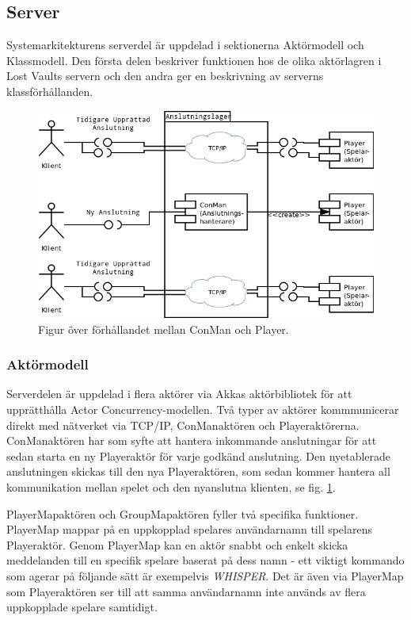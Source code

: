 \documentclass[a4paper]{article}
\begin{document}
\subsection{Server}
Systemarkitekturens serverdel är uppdelad i sektionerna Aktörmodell och Klassmodell. Den första delen beskriver funktionen hos de olika aktörlagren i Lost Vaults servern och den andra ger en  beskrivning av serverns klassförhållanden.

\begin{figure}[hbt]
\centering
\includegraphics[width=1.0\textwidth]{serverActorModel2-1}
\caption{\label{fig:ConManPlayer}Figur över förhållandet mellan ConMan och Player.}
\end{figure}

\subsubsection{Aktörmodell}
Serverdelen är uppdelad i flera aktörer via Akkas aktörbibliotek för att upprätthålla Actor Concurrency-modellen. 
Två typer av aktörer kommmunicerar direkt med nätverket via TCP/IP, ConManaktören och Playeraktörerna. ConManaktören har som syfte att hantera inkommande anslutningar för att sedan starta en ny Playeraktör för varje godkänd anslutning. Den nyetablerade anslutningen skickas till den nya Playeraktören, som sedan kommer hantera all kommunikation mellan spelet och den nyanslutna klienten, se fig. \ref{fig:ConManPlayer}.   

PlayerMapaktören och GroupMapaktören fyller två specifika funktioner. PlayerMap mappar på en uppkopplad spelares användarnamn till spelarens Playeraktör. Genom PlayerMap kan en aktör snabbt och enkelt skicka meddelanden till en specifik spelare baserat på dess namn - ett viktigt kommando som agerar på följande sätt är exempelvis \textit{WHISPER}. Det är även via PlayerMap som Playeraktören ser till att samma användarnamn inte används av flera uppkopplade spelare samtidigt.
\end{document}
